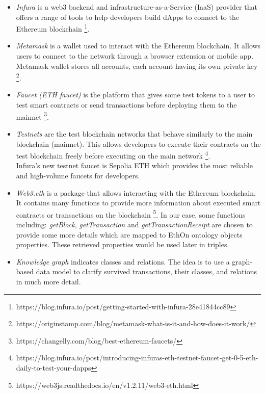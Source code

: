 \begin{itemize}
\item \textit{Infura} is a web3 backend and infrastructure-as-a-Service (IaaS) provider that offers a range of tools to help developers build dApps to connect to the Ethereum blockchain \footnote{https://blog.infura.io/post/getting-started-with-infura-28e41844cc89}.\\
\item \textit{Metamask} is a wallet used to interact with the Ethereum blockchain. It allows users to connect to the network through a browser extension or mobile app. Metamask wallet stores all accounts, each account having its own private key \footnote{https://originstamp.com/blog/metamask-what-is-it-and-how-does-it-work/}.\\
\item \textit{Faucet (ETH faucet)} is the platform that gives some test tokens to a user to test smart contracts or send transactions before deploying them to the mainnet \footnote{https://changelly.com/blog/best-ethereum-faucets/}. \\
\item \textit{Testnets} are the test blockchain networks that behave similarly to the main blockchain (mainnet). This allows developers to execute their contracts on the test blockchain freely before executing on the main network \footnote{https://blog.infura.io/post/introducing-infuras-eth-testnet-faucet-get-0-5-eth-daily-to-test-your-dapps}. \\
Infura's new testnet faucet is Sepolia ETH which provides the most reliable and high-volume faucets for developers.\\
\item \textit{Web3.eth} is a package that allows interacting with the Ethereum blockchain. It contains many functions to provide more information about executed smart contracts or transactions on the blockchain \footnote{https://web3js.readthedocs.io/en/v1.2.11/web3-eth.html}. 
In our case, some functions including: \textit{getBlock}, \textit{getTransaction} and \textit{getTransactionReceipt} are chosen to provide some more details which are mapped to EthOn ontology objects properties. These retrieved properties would be used later in triples.\\
\item \textit{Knowledge graph} indicates classes and relations.
The idea is to use a graph-based data model to clarify survived transactions, their classes, and relations in much more detail.
\begin{center}
	

\end{center}
\end{itemize}
